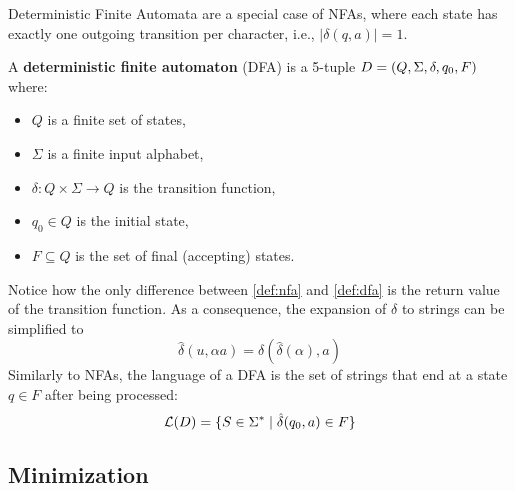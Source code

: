 
Deterministic Finite Automata are a special case of NFAs, where each state has exactly one outgoing transition per character, i.e., $|\delta(q, a)| = 1$.

\begin{definition} \label{def:dfa}
    A \textbf{deterministic finite automaton} (DFA) is a 5-tuple $D = (Q, \Sigma, \delta, q_0, F)$ where:
    \begin{itemize}
        \item $Q$ is a finite set of states,
        \item $\Sigma$ is a finite input alphabet,
        \item $\delta: Q \times \Sigma \rightarrow Q$ is the transition function,
        \item $q_0 \in Q$ is the initial state,
        \item $F \subseteq Q$ is the set of final (accepting) states.
    \end{itemize}
\end{definition}
Notice how the only difference between \cref{def:nfa} and \cref{def:dfa} is the return value of the transition function.
As a consequence, the expansion of $\delta$ to strings can be simplified to 
\[
    \hat\delta(u, \alpha a) = \delta(\hat\delta(\alpha), a)
\]
Similarly to NFAs, the language of a DFA is the set of strings that end at a state $q \in F$ after being processed:
\[
    \mathcal{L}(D) = \{S \in \Sigma^* \mid \hat\delta(q_0, a) \in F\}
\]


\subsection{Minimization}
